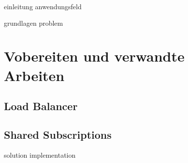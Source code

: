 \begin{comment}
Guidelines:
Seiten: 50
Präsentation: 30 min / Disskusion: 15 min
sonarqube als code scan (nur ein vorschlag)
\end{comment}

{einleitung}
{anwendungsfeld}

{grundlagen}
{problem}

\section{Vobereiten und verwandte Arbeiten}

\subsection{Load Balancer}

\subsection{Shared Subscriptions}

\begin{comment}
diese lösen das problem der teuren clients ABER clients müssen dann möglichst optimal auf die broker verteilt werden
-> load balancer

iot mqtt threat model ? maybe show this ?

- If your work is based on preliminary work, then outline this preliminary work: "The de-ployment into production is itself semi-automatic. In a continuous integration pipeline..."
- Do some research forrelated work, e.g., commercial products, research prototypes or con-ceptual research that have the same or similar objectives like your work. Compare and de-lineate your work with/from the related work.
- Keep an eye on the proper citation of the works you are describing
- Conclude this chapter with some insufficiencies or shortcomings of the preliminary or related work. This should motivate the necessity of your work.
\end{comment}

{solution}
{implementation}


